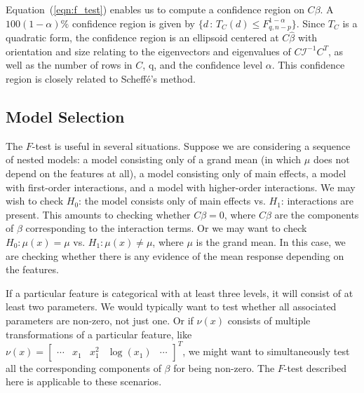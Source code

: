 \documentclass[12pt]{article}
\begin{document}
Equation~(\ref{eqn:f_test}) enables us to compute a confidence region on $C \beta$. A $100(1-\alpha)\%$ confidence region is given by $\{ d \, : \, T_C(d) \leq F_{q, n-p}^{1 - \alpha} \}$. Since $T_C$ is a quadratic form, the confidence region is an ellipsoid centered at $C \hat{\beta}$ with orientation and size relating to the eigenvectors and eigenvalues of $C\mathcal{I}^{-1} C^T$, as well as the number of rows in $C$, q, and the confidence level $\alpha$. This confidence region is closely related to Scheff\'e's method.

\subsection{Model Selection}
The $F$-test is useful in several situations. Suppose we are considering a sequence of nested models: a model consisting only of a grand mean (in which $\mu$ does not depend on the features at all), a model consisting only of main effects, a model with first-order interactions, and a model with higher-order interactions. We may wish to check $H_0$: the model consists only of main effects vs. $H_1$: interactions are present. This amounts to checking whether $C \beta = 0$, where $C \beta$ are the components of $\beta$ corresponding to the interaction terms. Or we may want to check $H_0: \mu(x) = \mu$ vs. $H_1: \mu(x) \neq \mu$, where $\mu$ is the grand mean. In this case, we are checking whether there is any evidence of the mean response depending on the features.

If a particular feature is categorical with at least three levels, it will consist of at least two parameters. We would typically want to test whether all associated parameters are non-zero, not just one. Or if $\nu(x)$ consists of multiple transformations of a particular feature, like $\nu(x) = \begin{bmatrix} \cdots & x_1 & x_1^2 & \log(x_1) & \cdots \end{bmatrix}^T$, we might want to simultaneously test all the corresponding components of $\beta$ for being non-zero. The $F$-test described here is applicable to these scenarios.
\end{document}
